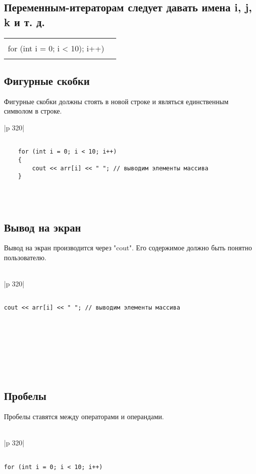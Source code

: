\documentclass{article}
\begin{document}
\subsection{Переменным-итераторам следует давать имена i, j, k и т. д.}

\begin{tabular}{|c|c}
\hline
    \\
    for (int i = 0; i < 10); i++)\\
    \\
\hline      
\end{tabular}

\subsection{Фигурные скобки}
Фигурные скобки должны стоять в новой строке и являться единственным символом в строке.\\
\begin{tabular}{|p {320}|}
\hline
\\
    \begin{verbatim}

    for (int i = 0; i < 10; i++) 
    {
        cout << arr[i] << " "; // выводим элементы массива
    }
            
    \end{verbatim}
\\
\hline      
\end{tabular}

\subsection{Вывод на экран}
Вывод на экран производится через "cout".
Его содержимое должно быть понятно пользователю.\\
\\
\begin{tabular}{|p {320}|}
\hline
\begin{verbatim}

cout << arr[i] << " "; // выводим элементы массива

\end{verbatim}
\\
\hline      
\end{tabular}
\\
\\
\\
\\
\subsection{Пробелы}
Пробелы ставятся между операторами и операндами.\\
\\
\begin{tabular}{|p {320}|}
\hline
\begin{verbatim}

for (int i = 0; i < 10; i++)

\end{verbatim}
\\
\hline      
\end{tabular}
\end{document}
